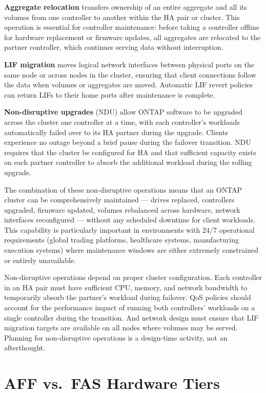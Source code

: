 \textbf{Aggregate relocation} transfers ownership of an entire aggregate and all its volumes from one controller to another within the HA pair or cluster. This operation is essential for controller maintenance: before taking a controller offline for hardware replacement or firmware updates, all aggregates are relocated to the partner controller, which continues serving data without interruption.

\textbf{LIF migration} moves logical network interfaces between physical ports on the same node or across nodes in the cluster, ensuring that client connections follow the data when volumes or aggregates are moved. Automatic LIF revert policies can return LIFs to their home ports after maintenance is complete.

\textbf{Non-disruptive upgrades} (NDU) allow ONTAP software to be upgraded across the cluster one controller at a time, with each controller's workloads automatically failed over to its HA partner during the upgrade. Clients experience no outage beyond a brief pause during the failover transition. NDU requires that the cluster be configured for HA and that sufficient capacity exists on each partner controller to absorb the additional workload during the rolling upgrade.

The combination of these non-disruptive operations means that an ONTAP cluster can be comprehensively maintained --- drives replaced, controllers upgraded, firmware updated, volumes rebalanced across hardware, network interfaces reconfigured --- without any scheduled downtime for client workloads. This capability is particularly important in environments with 24/7 operational requirements (global trading platforms, healthcare systems, manufacturing execution systems) where maintenance windows are either extremely constrained or entirely unavailable.

Non-disruptive operations depend on proper cluster configuration. Each controller in an HA pair must have sufficient CPU, memory, and network bandwidth to temporarily absorb the partner's workload during failover. QoS policies should account for the performance impact of running both controllers' workloads on a single controller during the transition. And network design must ensure that LIF migration targets are available on all nodes where volumes may be served. Planning for non-disruptive operations is a design-time activity, not an afterthought.

\section{AFF vs.\ FAS Hardware Tiers}

